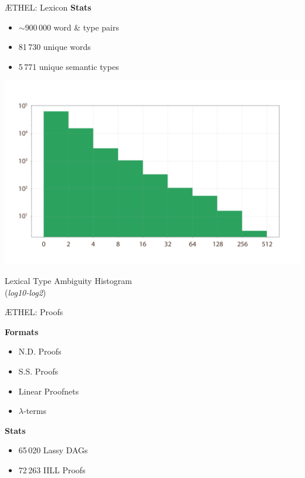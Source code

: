 \documentclass{beamer}
\begin{document}
{
\begin{frame}{\AE THEL: Lexicon}
	\textbf{Stats}
	\begin{itemize}
	\item $\sim$900\,000 word \& type pairs
	\item 81\,730 unique words
	\item 5\,771 unique semantic types
	\end{itemize}

	\begin{minipage}{0.725\textwidth}
	\includegraphics[width=\textwidth,height=0.65\textheight,keepaspectratio]{figure_2_2.png}	
	\end{minipage}%
	\begin{minipage}{0.275\textwidth}
	\scriptsize{Lexical Type Ambiguity Histogram\\
	(\textit{log10-log2})}
	\end{minipage}
\end{frame}


\begin{frame}{\AE THEL: Proofs}

	\begin{minipage}[t]{0.5\textwidth}
	\textbf{Formats}
	\begin{itemize}
	\item N.D. Proofs
	\item S.S. Proofs
	\item Linear Proofnets
	\item $\lambda$-terms
	\end{itemize}	
	\end{minipage}%
	\begin{minipage}[t]{0.5\textwidth}
	\textbf{Stats}
	\begin{itemize}
	\item 65\,020 Lassy DAGs
	\item 72\,263 IILL Proofs
	\end{itemize}
	\end{minipage}
	

\end{frame}}
\end{document}
